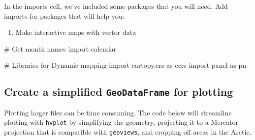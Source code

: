 \documentclass[
  letterpaper,
  DIV=11,
  numbers=noendperiod,
  oneside]{scrreprt}
\newenvironment{Shaded}{\begin{snugshade}}{\end{snugshade}}
\newcommand{\CommentTok}[1]{\textcolor[rgb]{0.37,0.37,0.37}{#1}}
\newcommand{\ImportTok}[1]{\textcolor[rgb]{0.00,0.46,0.62}{#1}}
\newcommand{\NormalTok}[1]{\textcolor[rgb]{0.00,0.23,0.31}{#1}}
\providecommand{\tightlist}{%
  \setlength{\itemsep}{0pt}\setlength{\parskip}{0pt}}
\begin{document}
\begin{tcolorbox}[enhanced jigsaw, colbacktitle=quarto-callout-color!10!white, opacityback=0, bottomtitle=1mm, toptitle=1mm, bottomrule=.15mm, left=2mm, colframe=quarto-callout-color-frame, leftrule=.75mm, opacitybacktitle=0.6, colback=white, rightrule=.15mm, toprule=.15mm, breakable, titlerule=0mm, title=\textcolor{quarto-callout-color}{\faInfo}\hspace{0.5em}{Try It: Import packages}, coltitle=black, arc=.35mm]

In the imports cell, we've included some packages that you will need.
Add imports for packages that will help you:

\begin{enumerate}
\def\labelenumi{\arabic{enumi}.}
\tightlist
\item
  Make interactive maps with vector data
\end{enumerate}

\end{tcolorbox}

\begin{Shaded}
\begin{Highlighting}[]
\CommentTok{\# Get month names}
\ImportTok{import}\NormalTok{ calendar}

\CommentTok{\# Libraries for Dynamic mapping}
\ImportTok{import}\NormalTok{ cartopy.crs }\ImportTok{as}\NormalTok{ ccrs}
\ImportTok{import}\NormalTok{ panel }\ImportTok{as}\NormalTok{ pn}
\end{Highlighting}
\end{Shaded}

\subsection{\texorpdfstring{Create a simplified \texttt{GeoDataFrame}
for
plotting}{Create a simplified GeoDataFrame for plotting}}\label{create-a-simplified-geodataframe-for-plotting}

Plotting larger files can be time consuming. The code below will
streamline plotting with \texttt{hvplot} by simplifying the geometry,
projecting it to a Mercator projection that is compatible with
\texttt{geoviews}, and cropping off areas in the Arctic.
\end{document}
